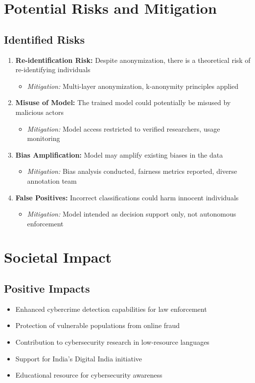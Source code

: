 \documentclass[10pt,a4paper]{article}
\begin{document}
\section{Potential Risks and Mitigation}

\subsection{Identified Risks}
\begin{enumerate}[leftmargin=*]
\item \textbf{Re-identification Risk:} Despite anonymization, there is a theoretical risk of re-identifying individuals
  \begin{itemize}
  \item \textit{Mitigation:} Multi-layer anonymization, k-anonymity principles applied
  \end{itemize}

\item \textbf{Misuse of Model:} The trained model could potentially be misused by malicious actors
  \begin{itemize}
  \item \textit{Mitigation:} Model access restricted to verified researchers, usage monitoring
  \end{itemize}

\item \textbf{Bias Amplification:} Model may amplify existing biases in the data
  \begin{itemize}
  \item \textit{Mitigation:} Bias analysis conducted, fairness metrics reported, diverse annotation team
  \end{itemize}

\item \textbf{False Positives:} Incorrect classifications could harm innocent individuals
  \begin{itemize}
  \item \textit{Mitigation:} Model intended as decision support only, not autonomous enforcement
  \end{itemize}
\end{enumerate}

\section{Societal Impact}

\subsection{Positive Impacts}
\begin{itemize}[leftmargin=*]
\item Enhanced cybercrime detection capabilities for law enforcement
\item Protection of vulnerable populations from online fraud
\item Contribution to cybersecurity research in low-resource languages
\item Support for India's Digital India initiative
\item Educational resource for cybersecurity awareness
\end{itemize}
\end{document}
